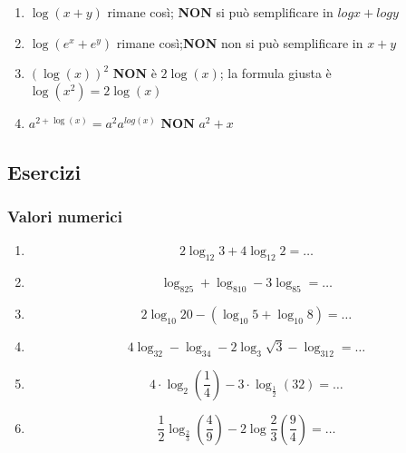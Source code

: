 \begin{enumerate}
\item $\log(x + y)$ rimane così; \textbf{NON} si può semplificare in $log x + log y$
\item $\log(e^x+e^y)$ rimane così;\textbf{NON} non si può semplificare in $x + y$
\item $(\log(x))^2$ \textbf{NON} è $2\log(x)$; la formula giusta è $\log(x^2)=2\log(x)$
\item $a^{2+\log(x)}=a^2a^{log(x)}$ \textbf{NON} $a^2+x$
\end{enumerate}

\subsection{Esercizi}
\subsubsection{Valori numerici}\label{subsec:val_num}

\begin{enumerate} %
\item  
\begin{equation*}
2\log_{12}3+4\log_{12}2=\ldots
\end{equation*}


\item \begin{equation*}
\log_825+\log_810-3\log_85=\ldots
\end{equation*}

\item \begin{equation*}
2\log_{10}20-(\log_{10}5+\log_{10}8)=\ldots
\end{equation*}

\item \begin{equation*}
4\log_32-\log_34-2\log_3\sqrt{3}-\log_312=\ldots
\end{equation*}

\item \begin{equation*}
4\cdot\log_2\left(\frac{1}{4}\right)-3\cdot\log_{\frac{1}{2}}(32)=\ldots
\end{equation*}

\item\begin{equation*}
\frac{1}{2}\log_{\frac{2}{3}}\left(\frac{4}{9}\right)
-2\log\frac{2}{3}\left(\frac{9}{4}\right)=\ldots
\end{equation*}

\end{enumerate} %

